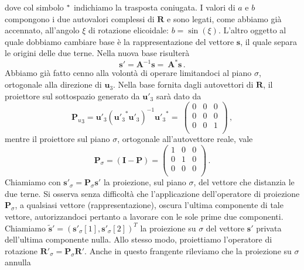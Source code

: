 \noindent dove col simbolo $\null^*$ indichiamo la trasposta coniugata.
I valori di $a$ e $b$ compongono i due autovalori complessi di
$\bm R$ e sono legati, come abbiamo gi\`a 
accennato, all'angolo $\xi$ di rotazione elicoidale: $b=\sin(\xi)$.
L'altro oggetto al quale dobbiamo cambiare base \`e la rappresentazione
del vettore ${{\bm s}}$, il quale
separa le origini delle due terne. Nella nuova base risulter\`a
\begin{equation}
{{\bm s}}'={\bm A}^{-1} {{\bm s}}=\
{\bm A}^* {{\bm s}}\,.
\label{eq:sjp}
\end{equation}
\noindent Abbiamo gi\`a fatto cenno alla volont\`a di operare
limitandoci al piano $\sigma$, ortogonale alla direzione di ${\bm u}_3$.
Nella base fornita dagli autovettori di $\bm R$,
il proiettore sul sottospazio generato da ${\bm u}'_3$
sar\`a dato da
\begin{equation}
{{\bm P}_u}_3={\bm u}'_3 ({{\bm u}'_3}^{*} {\bm u}'_3)^{-1}{{\bm u}'_3}^{*}=\
\left( \begin{array}{ccc}
0 & 0 & 0\\
0 & 0 & 0\\
0 & 0 & 1\\
\end{array}
\right)
\,,
\label{eq:op_proiez}
\end{equation}
\noindent mentre il proiettore sul piano $\sigma$, ortogonale 
all'autovettore reale, vale
\begin{equation}
{\bm P}_{\sigma}=({\bm I}-{\bm P})=\left( \begin{array}{ccc}
1 & 0 & 0\\
0 & 1 & 0\\
0 & 0 & 0\\
\end{array}
\right)
\,.
\label{eq:proiettore}
\end{equation}
\noindent Chiamiamo con ${{{\bm s}}}'_{\sigma}={\bm P}_{\sigma}{{\bm s}}'$ 
la proiezione, sul piano $\sigma$, del vettore che distanzia le due terne.
Si osserva senza difficolt\`a che l'applicazione dell'operatore
di proiezione ${\bm P}_{\sigma}$, a qualsiasi vettore (rappresentazione),
oscura l'ultima componente di tale vettore, autorizzandoci pertanto a lavorare
con le sole prime due componenti. Chiamiamo
$\tilde{\bm s}'=({{\bm s}'_{\sigma}}[1],{{\bm s}'_{\sigma}}[2])^T$
la proiezione su $\sigma$ del vettore $\bm s'$ privata dell'ultima
componente nulla.
Allo stesso modo, proiettiamo l'operatore di rotazione
${\bm R}'_{\sigma}={\bm P}_{\sigma}{\bm R}'$.
Anche in questo frangente rileviamo che la proiezione su  $\sigma$ annulla
